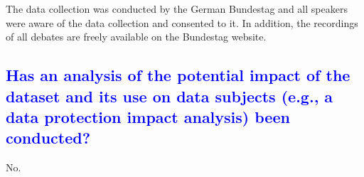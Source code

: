 \documentclass[letterpaper, 10 pt, conference]{ieeeconf}  %
\begin{document}
The data collection was conducted by the German Bundestag and all speakers were aware of the data collection and consented to it. In addition, the recordings of all debates are freely available on the Bundestag website.









\textcolor{blue}{\subsection{Has an analysis of the potential impact of the dataset and its use on data subjects (e.g., a data protection impact analysis) been conducted?}} %

No.



\medskip




\end{document}
